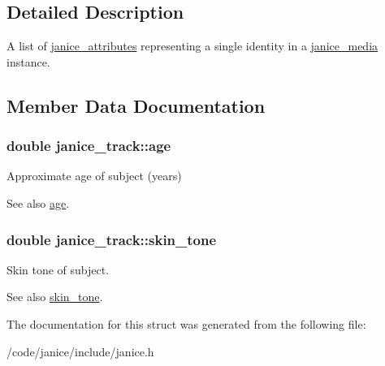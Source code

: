 \subsection{Detailed Description}
A list of \hyperlink{structjanice__attributes}{janice\+\_\+attributes} representing a single identity in a \hyperlink{structjanice__media}{janice\+\_\+media} instance. 

\subsection{Member Data Documentation}
\hypertarget{structjanice__track_aa5d7b3e46bff9565b07dfcaa5cc1a90f}{}
\subsubsection[{age}]{\setlength{\rightskip}{0pt plus 5cm}double janice\+\_\+track\+::age}\label{structjanice__track_aa5d7b3e46bff9565b07dfcaa5cc1a90f}


Approximate age of subject (years) 

\begin{DoxySeeAlso}{See also}
\hyperlink{structjanice__track_aa5d7b3e46bff9565b07dfcaa5cc1a90f}{age}. 
\end{DoxySeeAlso}
\hypertarget{structjanice__track_a0dd3c201c19faa0d711f698266f23eda}{}
\subsubsection[{skin\+\_\+tone}]{\setlength{\rightskip}{0pt plus 5cm}double janice\+\_\+track\+::skin\+\_\+tone}\label{structjanice__track_a0dd3c201c19faa0d711f698266f23eda}


Skin tone of subject. 

\begin{DoxySeeAlso}{See also}
\hyperlink{structjanice__track_a0dd3c201c19faa0d711f698266f23eda}{skin\+\_\+tone}. 
\end{DoxySeeAlso}


The documentation for this struct was generated from the following file\+:\begin{DoxyCompactItemize}
\item 
/code/janice/include/janice.\+h\end{DoxyCompactItemize}
